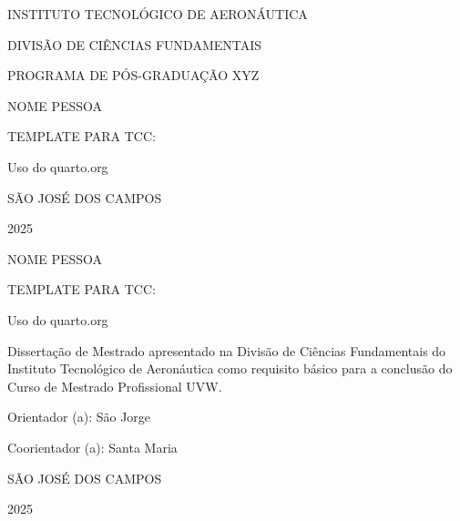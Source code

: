 \documentclass[
  12pt,
  oneside,
  a4paper,
  english,
  brazil]{abntex2}
\author{}
\date{}
\begin{document}
\setlength{\parindent}{0mm}
\ABNTEXchapterfont\normalsize

\ABNTEXchapterfont\normalsize

\begin{center}
\uppercase{ Instituto Tecnológico de Aeronáutica }

\uppercase{ Divisão de Ciências Fundamentais }

\uppercase{ Programa de Pós-Graduação XYZ }

\vfill

\uppercase{ Nome Pessoa }

\vfill

\uppercase{ Template para TCC: }


Uso do quarto.org



\vfill

\uppercase{ São José dos Campos }


2025



\end{center}

\newpage{}

\begin{center}
\uppercase{ Nome Pessoa }

\vspace{6cm}

\uppercase{ Template para TCC: }


Uso do quarto.org



\vspace{3cm}

\hfill\begin{minipage}{0.5\textwidth}
Dissertação de Mestrado apresentado na Divisão de Ciências Fundamentais do Instituto Tecnológico de Aeronáutica como requisito básico para a conclusão do Curso de Mestrado Profissional UVW.

\vspace{1cm}

Orientador (a): São Jorge

Coorientador (a): Santa Maria

\end{minipage}

\vfill

\uppercase{ São José dos Campos }


2025



\end{center}
\end{document}
